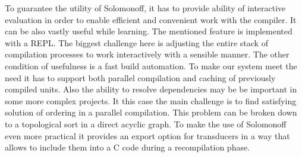 To guarantee the utility of Solomonoff, it has to provide ability of interactive evaluation in order to enable efficient and convenient work with the compiler. It can be also vastly useful while learning. The mentioned feature is implemented with a REPL. The biggest challenge here is adjusting the entire stack of compilation processes to work interactively with a sensible manner. The other condition of usefulness is a fast build automation. To make our system meet the
need it has to support both parallel compilation and caching of previously compiled units. Also the ability to resolve dependencies may be be important in some more complex projects. It this case the main challenge is to find satisfying solution of ordering in a parallel compilation. This problem can be broken down to a topological sort in a direct acyclic graph.
To make the use of Solomonoff even more practical it provides an export option for transducers in a way that allows to include them into a C code during a recompilation phase. 
